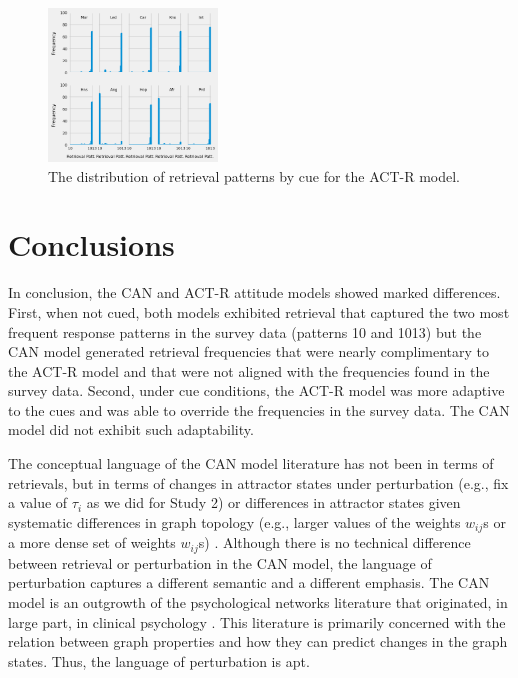 \documentclass[10pt,letterpaper]{article}
\begin{document}
\begin{figure}[H]
\begin{center}
\includegraphics[width=0.4\textwidth,height=0.3\textwidth]{IBL_Gibbs_Cued_2X5.png}
\end{center}
\caption{The distribution of retrieval patterns by cue for the ACT-R model.} 
\label{ibl-gibbs-cued-figure}
\end{figure}


\section{Conclusions}\label{conclusion}
In conclusion, the CAN and ACT-R attitude models showed marked differences.  First, when not cued, both models exhibited retrieval that captured the two most frequent response patterns in the survey data (patterns 10 and 1013) but the CAN model generated retrieval frequencies that were nearly complimentary to the ACT-R model and that were not aligned with the frequencies found in the survey data.  Second, under cue conditions, the ACT-R model was more adaptive to the cues and was able to override the frequencies in the survey data.  The CAN model did not exhibit such adaptability.

The conceptual language of the CAN model literature has not been in terms of retrievals, but in terms of changes in attractor states under perturbation (e.g., fix a value of $\tau_i$ as we did for Study 2) or differences in attractor states given systematic differences in graph topology (e.g., larger values of the weights $w_{ij}$s or a more dense set of weights $w_{ij}$s) \citep{dalege2016,DalegeMaas2017,DalegevanderMaas2020}. Although there is no technical difference between retrieval or perturbation in the CAN model, the language of perturbation captures a different semantic and a different emphasis.  The CAN model is an outgrowth of the psychological networks literature that originated, in large part, in clinical psychology \citep[see][]{Bringmann2018, Bringmann2021, bringmann2019centrality, WichersWigman2015, cramer2016major, burger2020bridging, haslbeck2021modeling}.  This literature is primarily concerned with the relation between graph properties and how they can predict changes in the graph states. Thus, the language of perturbation is apt.  
\end{document}
